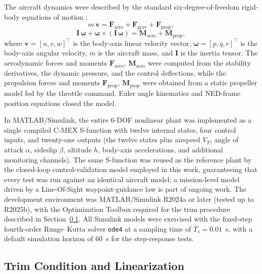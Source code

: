 \documentclass{ieeeaccess}
\begin{document}
The aircraft dynamics were described by the standard six-degree-of-freedom rigid-body equations of motion \cite{stevens2016aircraft,nelson1998flight}:
\begin{equation}
m\,\dot{\mathbf{v}} = \mathbf{F}_\text{aero} + \mathbf{F}_\text{grav} + \mathbf{F}_\text{prop},
\label{eq:force}
\end{equation}
\begin{equation}
\mathbf{I}\,\dot{\boldsymbol{\omega}} + \boldsymbol{\omega}\times(\mathbf{I}\,\boldsymbol{\omega}) = \mathbf{M}_\text{aero} + \mathbf{M}_\text{prop},
\label{eq:moment}
\end{equation}
where $\mathbf{v} = [u, v, w]^\top$ is the body-axis linear velocity vector, $\boldsymbol{\omega} = [p, q, r]^\top$ is the body-axis angular velocity, $m$ is the aircraft mass, and $\mathbf{I}$ is the inertia tensor. The aerodynamic forces and moments $\mathbf{F}_\text{aero}$, $\mathbf{M}_\text{aero}$ were computed from the stability derivatives, the dynamic pressure, and the control deflections, while the propulsion forces and moments $\mathbf{F}_\text{prop}$, $\mathbf{M}_\text{prop}$ were obtained from a static propeller model fed by the throttle command. Euler angle kinematics and NED-frame position equations closed the model.

In MATLAB/Simulink, the entire 6-DOF nonlinear plant was implemented as a single compiled C-MEX S-function with twelve internal states, four control inputs, and twenty-one outputs (the twelve states plus airspeed $V_T$, angle of attack $\alpha$, sideslip $\beta$, altitude $h$, body-axis accelerations, and additional monitoring channels). The same S-function was reused as the reference plant by the closed-loop control-validation model employed in this work, guaranteeing that every test was run against an identical aircraft model; a mission-level model driven by a Line-Of-Sight waypoint-guidance law is part of ongoing work. The development environment was MATLAB/Simulink R2024a or later (tested up to R2025b), with the Optimization Toolbox required for the trim procedure described in Section~\ref{sec:trim}. All Simulink models were exercised with the fixed-step fourth-order Runge--Kutta solver \texttt{ode4} at a sampling time of $T_s = 0.01$~s, with a default simulation horizon of $60$~s for the step-response tests.

\subsection{Trim Condition and Linearization}
\label{sec:trim}
\end{document}
